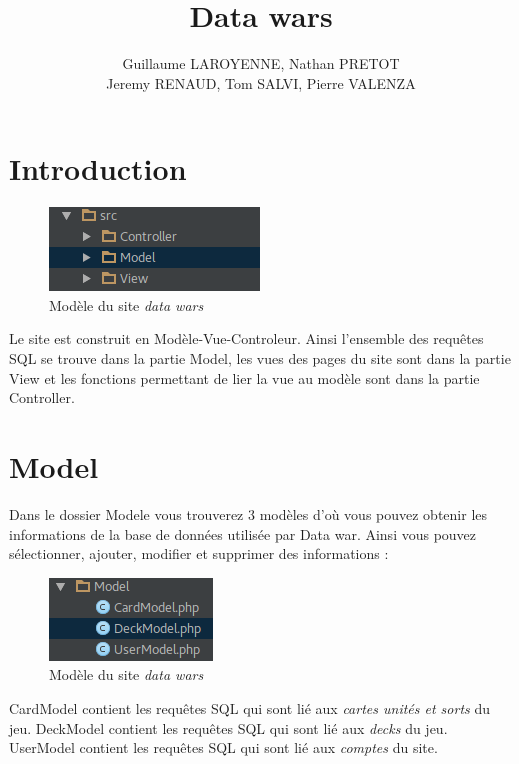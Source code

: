 \documentclass[a4paper,11pt]{report}
\title{Data wars }
\author{Guillaume LAROYENNE, Nathan PRETOT \\ Jeremy RENAUD, Tom SALVI, Pierre VALENZA}
\begin{document}
\maketitle
\tableofcontents

\chapter{Introduction}

	\begin{figure}[th]
		\begin{center}
		\includegraphics[scale=0.4]{Assets/mvc.png}
      		\caption{Modèle du site \textit{data wars}}
      		\label{fig1}
     		\end{center}
	\end{figure}

	Le site est construit en Modèle-Vue-Controleur. Ainsi l'ensemble des requêtes SQL se trouve dans la partie Model, les vues des pages du site sont dans la partie View et les fonctions permettant de lier la vue au modèle sont dans la partie Controller.

\chapter{Model}
	Dans le dossier Modele vous trouverez 3 modèles d'où vous pouvez obtenir les informations de la base de données utilisée par Data war. Ainsi vous pouvez sélectionner, ajouter, modifier et supprimer des informations :

	\begin{figure}[th]
		\begin{center}
		\includegraphics[scale=0.4]{Assets/modele.png}
      		\caption{Modèle du site \textit{data wars}}
      		\label{fig2}
     		\end{center}
	\end{figure}
    
	CardModel contient les requêtes SQL qui sont lié aux \textit{cartes unités et sorts} du jeu.
	DeckModel contient les requêtes SQL qui sont lié aux \textit{decks} du jeu.
	UserModel contient les requêtes SQL qui sont lié aux \textit{comptes} du site.    
\end{document}
